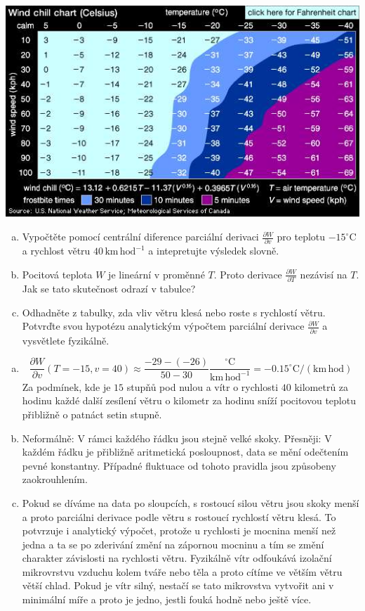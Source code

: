 \includegraphics[width=\linewidth]{air-temperature.jpg}

\begin{enumerate}[a)]
\item Vypočtěte pomocí centrální diference parciální derivaci
$\frac {\partial W}{\partial v}$ pro teplotu $-15^\circ\mathrm C$ a rychlost větru $40\,\mathrm{km}\,\mathrm{hod}^{-1}$ a intepretujte výsledek slovně.
\item Pocitová teplota $W$ je lineární v proměnné $T$. Proto derivace $\frac{\partial W}{\partial T}$ nezávisí na $T$. Jak se tato skutečnost
  odrazí v tabulce?
  \item Odhadněte z tabulky, zda vliv větru klesá nebo roste s rychlostí větru. Potvrďte svou hypotézu analytickým výpočtem parciální derivace $\frac{\partial W}{\partial v}$ a vysvětlete fyzikálně.
\end{enumerate}

\reseni
\begin{enumerate}[a)]
\item
  $$\frac {\partial W}{\partial v}(T=-15,v=40)\approx\frac{-29-(-26)}{50-30}\frac{{}^\circ \mathrm C}{\mathrm{km}\,\mathrm{hod}^{-1}}=-0.15^\circ \mathrm C/(\mathrm{km}\,\mathrm{hod})$$
  Za podmínek, kde je $15$ stupňů pod nulou a vítr o rychlosti $40$
kilometrů za hodinu každé další zesílení větru o kilometr za hodinu
sníží pocitovou teplotu přibližně o patnáct setin stupně.
\item Neformálně: V rámci každého řádku jsou stejně velké
  skoky. Přesněji: V každém řádku je přibližně aritmetická
  posloupnost, data se mění odečtením pevné konstantny. Případné
  fluktuace od tohoto pravidla jsou způsobeny zaokrouhlením.
\item Pokud se díváme na data po sloupcích, s rostoucí silou větru
  jsou skoky menší a proto parciálni derivace podle větru s rostoucí
  rychlostí větru klesá. To potvrzuje i analytický výpočet, protože u
  rychlosti je mocnina menší než jedna a ta se po zderivání změní na
  zápornou mocninu a tím se změní charakter závislosti na rychlosti
  větru. Fyzikálně vítr odfoukává izolační mikrovrstvu vzduchu kolem
  tváře nebo těla a proto cítíme ve větším větru větší chlad. Pokud je
  vítr silný, nestačí se tato mikrovstva vytvořit ani v minimální míře
  a proto je jedno, jestli fouká hodně nebo ještě více.
\end{enumerate}
\konec

